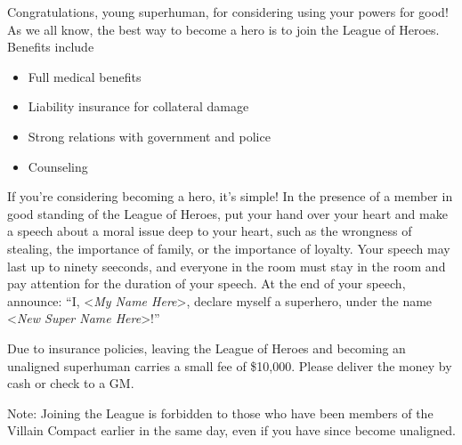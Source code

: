 \documentclass[white]{guildcamp1}
\begin{document}
\name{\wHeroRecruitment{}}

Congratulations, young superhuman, for considering using your powers for good!  As we all know, the best way to become a hero is to join the League of Heroes.  Benefits include

\begin{itemize}
\item Full medical benefits
\item Liability insurance for collateral damage
\item Strong relations with government and police
\item Counseling
\end{itemize}

If you're considering becoming a hero, it's simple!  In the presence of a member in good standing of the League of Heroes, put your hand over your heart and make a speech  about a moral issue deep to your heart, such as the wrongness of stealing, the importance of family, or the importance of loyalty.  Your speech may last up to ninety seeconds, and everyone in the room must stay in the room and pay attention for the duration of your speech.  At the end of your speech, announce: ``I, <\textit{My Name Here}>, declare myself a superhero, under the name <\textit{New Super Name Here}>!''

Due to insurance policies, leaving the League of Heroes and becoming an unaligned superhuman carries a small fee of \$10,000.  Please deliver the money by cash or check to a GM.

Note: Joining the League is forbidden to those who have been members of the Villain Compact earlier in the same day, even if you have since become unaligned.
\end{document}
